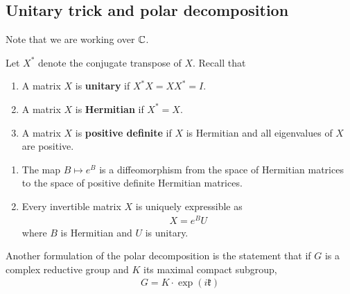 \documentclass[12pt]{article}
\begin{document}
\subsection{Unitary trick and polar decomposition}
Note that we are working over $\mathbb{C}$.
\begin{definition}
    Let $X^*$ denote the conjugate transpose of $X$. Recall that \begin{enumerate}
        \item A matrix $X$ is \textbf{unitary} if $X^*X = XX^* = I$.
        \item A matrix $X$ is \textbf{Hermitian} if $X^* = X$.
        \item A matrix $X$ is \textbf{positive definite} if $X$ is Hermitian and all eigenvalues of $X$ are positive.
    \end{enumerate}
\end{definition}
\begin{theorem}
    \begin{enumerate}
        \item The map $B \mapsto e^B$ is a diffeomorphism from the space of Hermitian matrices to the space of positive definite Hermitian matrices.
        \item Every invertible matrix $X$ is uniquely expressible as \begin{align*}
                  X = e^B U
              \end{align*} where $B$ is Hermitian and $U$ is unitary.
    \end{enumerate}
\end{theorem}
Another formulation of the polar decomposition is the statement that if $G$ is a complex reductive group and $K$ its maximal compact subgroup, \begin{align*}
    G = K \cdot \exp(i \mathfrak{k})
\end{align*}
\end{document}
